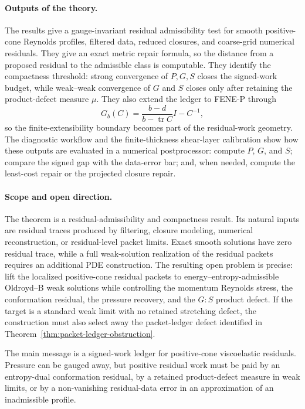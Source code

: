 \documentclass[11pt]{article}
\numberwithin{equation}{section}
\begin{document}
\paragraph{Outputs of the theory.}
The results give a gauge-invariant residual admissibility test for smooth
positive-cone Reynolds profiles, filtered data, reduced closures, and
coarse-grid numerical residuals.  They give an exact metric repair formula, so
the distance from a proposed residual to the admissible class is computable.
They identify the compactness threshold: strong convergence of \(P,G,S\) closes
the signed-work budget, while weak--weak convergence of \(G\) and \(S\) closes
only after retaining the product-defect measure \(\mu\).  They also extend the
ledger to FENE-P through
\[
  G_b(C)=\frac{b-d}{b-\operatorname{tr}C}I-C^{-1},
\]
so the finite-extensibility boundary becomes part of the residual-work
geometry.  The diagnostic workflow and the finite-thickness shear-layer
calibration show how these outputs are evaluated in a numerical postprocessor:
compute \(P\), \(G\), and \(S\); compare the signed gap with the data-error bar;
and, when needed, compute the least-cost repair or the projected closure repair.

\paragraph{Scope and open direction.}
The theorem is a residual-admissibility and compactness result.  Its natural
inputs are residual traces produced by filtering, closure modeling, numerical
reconstruction, or residual-level packet limits.  Exact smooth solutions have
zero residual trace, while a full weak-solution realization of the residual
packets requires an additional PDE construction.  The resulting open problem is
precise: lift the localized positive-cone residual packets to
energy--entropy-admissible Oldroyd--B weak solutions while controlling the
momentum Reynolds stress, the conformation residual, the pressure recovery, and
the \(G:S\) product defect.  If the target is a standard weak limit with no
retained stretching defect, the construction must also select away the
packet-ledger defect identified in Theorem~\ref{thm:packet-ledger-obstruction}.

The main message is a signed-work ledger for positive-cone viscoelastic
residuals.  Pressure can be gauged away, but positive residual work must be
paid by an entropy-dual conformation residual, by a retained product-defect
measure in weak limits, or by a non-vanishing residual-data error in an
approximation of an inadmissible profile.
\end{document}
